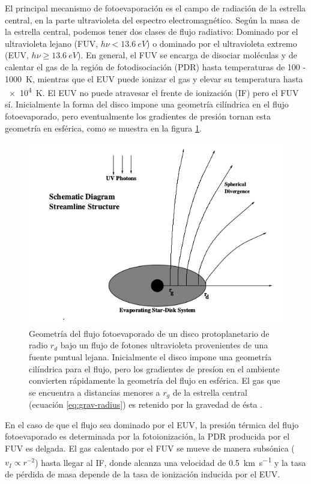 El principal mecanismo de fotoevaporación es el campo de radiación de la estrella central, en la parte ultravioleta del espectro electromagnético. Según la masa de la estrella central, podemos tener dos clases de flujo radiativo: Dominado por el ultravioleta lejano (FUV, $h\nu < \SI{13.6}{eV}$) o dominado por el ultravioleta extremo (EUV, $h\nu \geq \SI{13.6}{eV}$). En general, el FUV se encarga de disociar moléculas y de calentar el gas de la región de fotodisociación (PDR) hasta temperaturas de \SI{100}{} - \SI{1000}{K}, mientras que el EUV puede ionizar el gas y elevar su temperatura hasta \SI{e4}{K}. El EUV no puede atravesar el frente de ionización (IF) pero el FUV sí. Inicialmente la forma del disco impone una geometría cilíndrica en el flujo fotoevaporado, pero eventualmente los gradientes de presión tornan esta geometría en esférica, como se muestra en la figura \ref{fig:flux-geometry}.

\begin{figure}
  \centering
  \includegraphics[width=0.7\linewidth]{./Figures/Johnstone-1}
  \caption[Geometría del flujo fotoevaporado]{Geometría del flujo fotoevaporado de un disco protoplanetario de radio $r_d$ bajo un flujo de fotones ultravioleta provenientes de una fuente puntual lejana. Inicialmente el disco impone una geometría cilíndrica para el flujo, pero los gradientes de presíon en el ambiente convierten rápidamente la geometría del flujo en esférica. El gas que se encuentra a distancias menores a $r_g$ de la estrella central (ecuación \ref{eq:grav-radius}) es retenido por la gravedad de ésta \citep{Johnstone:1998}.}
  \label{fig:flux-geometry}
\end{figure}

En el caso de que el flujo sea dominado por el EUV, la presión térmica del flujo fotoevaporado es determinada por la fotoionización, la PDR producida por el FUV es delgada. El gas calentado por el FUV se mueve de manera subsónica ($v_I \propto r^{-2}$) hasta llegar al IF, donde alcanza una velocidad de \SI{0.5}{km.s^{-1}} y la tasa de pérdida de masa depende de la tasa de ionización inducida por el EUV.

